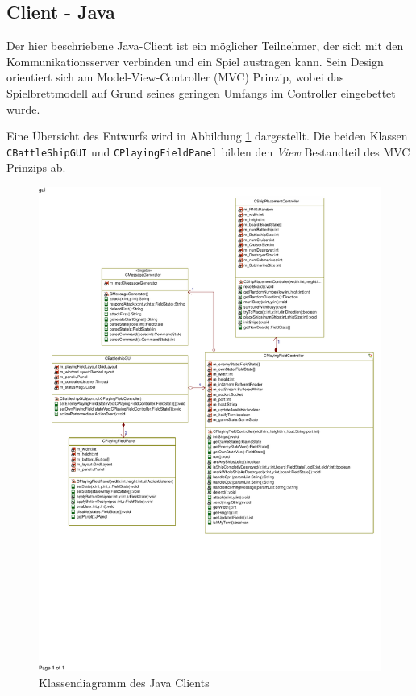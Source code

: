 \subsection{Client - Java}
\label{sec:Javaclient}

Der hier beschriebene Java-Client ist ein möglicher Teilnehmer, der sich mit den Kommunikationsserver verbinden und ein Spiel austragen kann.
Sein Design orientiert sich am Model-View-Controller (MVC) Prinzip, wobei das Spielbrettmodell auf Grund seines geringen Umfangs im Controller eingebettet wurde.

Eine Übersicht des Entwurfs wird in Abbildung \ref{fig:Javaclientklassendiagramm} dargestellt.
Die beiden Klassen \texttt{CBattleShipGUI} und \texttt{CPlayingFieldPanel} bilden den \emph{View} Bestandteil des MVC Prinzips ab.

\begin{figure}[H]
  \centering
  \includegraphics[trim=5mm 82mm 0mm 4mm,clip,width=1.0\textwidth]{images/CJavaClient.pdf}
  \caption{Klassendiagramm des Java Clients}
  \label{fig:Javaclientklassendiagramm}
\end{figure}

